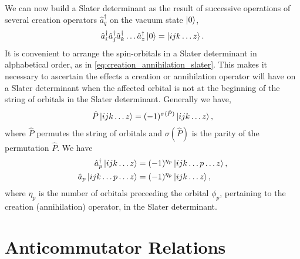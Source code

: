     We can now build a Slater determinant as the result of successive operations of
    several creation operators $\hat{a}_q^\dagger$ on the vacuum state $\ket{0}$,
    \begin{equation}
        \label{eq:creation_annihilation_slater}
        \hat{a}^\dagger_i \hat{a}^\dagger_j \hat{a}^\dagger_k \dots \hat{a}^\dagger_z
        \ket{0} = \ket{ijk \dots z}.
    \end{equation}
    It is convenient to arrange the spin-orbitals in a Slater determinant in
    alphabetical order, as in \autoref{eq:creation_annihilation_slater}. This 
    makes it necessary to ascertain the effects a creation or annihilation
    operator will have on a Slater determinant when the affected orbital is
    not at the beginning of the string of orbitals in the Slater determinant.
    Generally we have,
    \begin{equation}
        \hat{P} \ket{ijk \dots z} = (-1)^{\sigma(\hat{P})} \ket{ijk \dots z},
    \end{equation}
    where $\hat{P}$ permutes the string of orbitals and $\sigma(\hat{P})$ is the
    parity of the permutation $\hat{P}$. We have
    \begin{align}
        \hat{a}_p^\dagger \ket{ijk \dots z} &= 
            (-1)^{\eta_p} \ket{ijk \dots p \dots z}, \\
        \hat{a}_p \ket{ijk \dots p \dots z} &=
            (-1)^{\eta_p} \ket{ijk \dots z},
    \end{align}
    where $\eta_p$ is the number of orbitals preceeding the orbital $\phi_p$, pertaining
    to the creation (annihilation) operator, in the Slater determinant.

\section{Anticommutator Relations}

